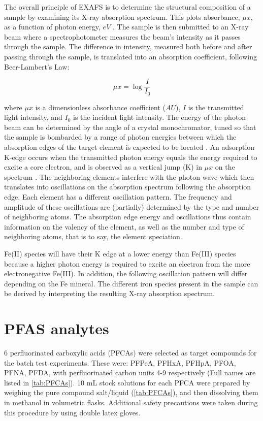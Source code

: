 The overall principle of EXAFS is to determine the structural composition of a sample by examining its X-ray absorption spectrum. This plots absorbance, $\mu x$, as a function of photon energy, $eV$ \citep{vlaica2004exafs}. The sample is then submitted to an X-ray beam where a spectrophotometer measures the beam's intensity as it passes through the sample. The difference in intensity, measured both before and after passing through the sample, is translated into an absorption coefficient, following Beer-Lambert's Law: 

\begin{equation}\label{eq:absorbance}
    \mu x = \log \frac{I}{I_0}
\end{equation}

where $\mu x$ is a dimensionless absorbance coefficient ($AU$), $I$ is the transmitted light intensity, and $I_0$ is the incident light intensity. The energy of the photon beam can be determined by the angle of a crystal monochromator, tuned so that the sample is bombarded by a range of photon energies between which the absorption edges of the target element is expected to be located \citep{vlaica2004exafs}. An adsorption K-edge occurs when the transmitted photon energy equals the energy required to excite a core electron, and is observed as a vertical jump (K) in $\mu x$ on the spectrum \citep{vlaica2004exafs}. The neighboring elements interfere with the photon wave which then translates into oscillations on the absorption spectrum following the absorption edge. Each element has a different oscillation pattern. The frequency and amplitude of these oscillations are (partially) determined by the type and number of neighboring atoms. The absorption edge energy and oscillations thus contain information on the valency of the element, as well as the number and type of neighboring atoms, that is to say, the element speciation.

Fe(II) species will have their K edge at a lower energy than Fe(III) species because a higher photon energy is required to excite an electron from the more electronegative Fe(III). In addition, the following oscillation pattern will differ depending on the Fe mineral. The different iron species present in the sample can be derived by interpreting the resulting X-ray absorption spectrum.


\section{PFAS analytes}\label{sec:PFCAanalytic}
6 perfluorinated carboxylic acids (PFCAs) were selected as target compounds for the batch test experiments. These were: PFPeA, PFHxA, PFHpA, PFOA, PFNA, PFDA, with perfluorinated carbon units 4-9 respectively (Full names are listed in \cref{tab:PFCAs}). 10 mL stock solutions for each PFCA were prepared by weighing the pure compound salt/liquid (\cref{tab:PFCAs}), and then dissolving them in methanol in volumetric flasks. Additional safety precautions were taken during this procedure by using double latex gloves. 


